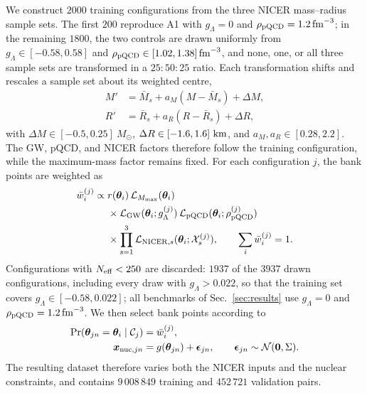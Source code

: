 \documentclass[aps,prd,twocolumn,superscriptaddress,nofootinbib,longbibliography]{revtex4-2}
\newcommand{\msun}{\ensuremath{M_\odot}}
\begin{document}
We construct $2000$ training configurations from the three NICER mass--radius
sample sets. The first $200$ reproduce A1 with
$g_\Lambda=0$ and $\rho_{\rm pQCD}=1.2\,{\rm fm}^{-3}$; in the remaining
$1800$, the two controls are drawn uniformly from $g_\Lambda\in[-0.58,0.58]$
and $\rho_{\rm pQCD}\in[1.02,1.38]\,{\rm fm}^{-3}$, and none, one, or all three
sample sets are
transformed in a $25{:}50{:}25$ ratio. Each transformation
shifts and rescales a sample set about its weighted centre,
\begin{align}
M'&=\bar M_s+a_M(M-\bar M_s)+\Delta M,\\
R'&=\bar R_s+a_R(R-\bar R_s)+\Delta R,
\label{eq:anet-cloud-transform}
\end{align}
with $\Delta M\in[-0.5,0.25]~\msun$,
$\Delta R\in[-1.6,1.6]~{\rm km}$, and $a_M,a_R\in[0.28,2.2]$.
The GW, pQCD, and NICER factors therefore follow the
training configuration, while the maximum-mass factor remains fixed. For each
configuration $j$, the bank points are weighted as
\begin{equation}
\begin{aligned}
\bar w_i^{(j)}\propto
{}&r(\bm\theta_i)\,
\mathcal L_{M_{\max}}(\bm\theta_i)\\
&\times\mathcal L_{\rm GW}(\bm\theta_i;g_\Lambda^{(j)})\,
\mathcal L_{\rm pQCD}(\bm\theta_i;\rho_{\rm pQCD}^{(j)})\\
&\times\prod_{s=1}^{3}
\mathcal L_{{\rm NICER},s}
(\bm\theta_i;\mathcal X_s^{(j)}),
\qquad \sum_i\bar w_i^{(j)}=1.
\end{aligned}
\label{eq:anet-scenario-weight}
\end{equation}
Configurations with $N_{\rm eff}<250$ are discarded: $1937$ of the $3937$ drawn
configurations, including every draw with $g_\Lambda>0.022$, so that the
training set covers $g_\Lambda\in[-0.58,0.022]$; all benchmarks of
Sec.~\ref{sec:results} use $g_\Lambda=0$ and $\rho_{\rm pQCD}=1.2\,{\rm fm}^{-3}$.
We then select bank
points according to
\begin{align}
\Pr\!\left(\bm\theta_{jn}=\bm\theta_i\mid\mathcal C_j\right)
 &=\bar w_i^{(j)},\\
\bm x_{{\rm nuc},jn}&=g(\bm\theta_{jn})+\bm\epsilon_{jn},
\qquad \bm\epsilon_{jn}\sim\mathcal N(\bm0,\Sigma).
\label{eq:anet-training-pairs}
\end{align}
The resulting dataset therefore varies both the NICER inputs and the nuclear
constraints, and contains $9\,008\,849$ training and $452\,721$ validation
pairs.
\end{document}

